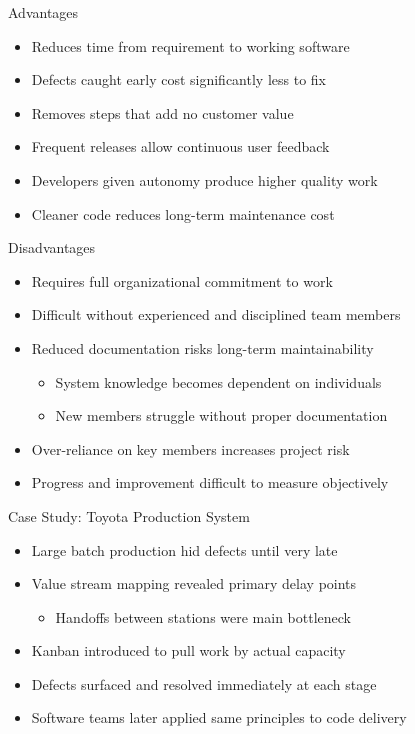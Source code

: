 \documentclass{thapathali}
\begin{document}
\begin{frame}{Advantages}
    \begin{itemize}
        \item Reduces time from requirement to working software
        \item Defects caught early cost significantly less to fix
        \item Removes steps that add no customer value
        \item Frequent releases allow continuous user feedback
        \item Developers given autonomy produce higher quality work
        \item Cleaner code reduces long-term maintenance cost
    \end{itemize}
\end{frame}

\begin{frame}{Disadvantages}
    \begin{itemize}
        \item Requires full organizational commitment to work
        \item Difficult without experienced and disciplined team members
        \item Reduced documentation risks long-term maintainability
        \begin{itemize}
            \item System knowledge becomes dependent on individuals
            \item New members struggle without proper documentation
        \end{itemize}
        \item Over-reliance on key members increases project risk
        \item Progress and improvement difficult to measure objectively
    \end{itemize}
\end{frame}

\begin{frame}{Case Study: Toyota Production System}
    \begin{itemize}
        \item Large batch production hid defects until very late
        \item Value stream mapping revealed primary delay points
        \begin{itemize}
            \item Handoffs between stations were main bottleneck
        \end{itemize}
        \item Kanban introduced to pull work by actual capacity
        \item Defects surfaced and resolved immediately at each stage
        \item Software teams later applied same principles to code delivery
    \end{itemize}
\end{frame}
\end{document}
